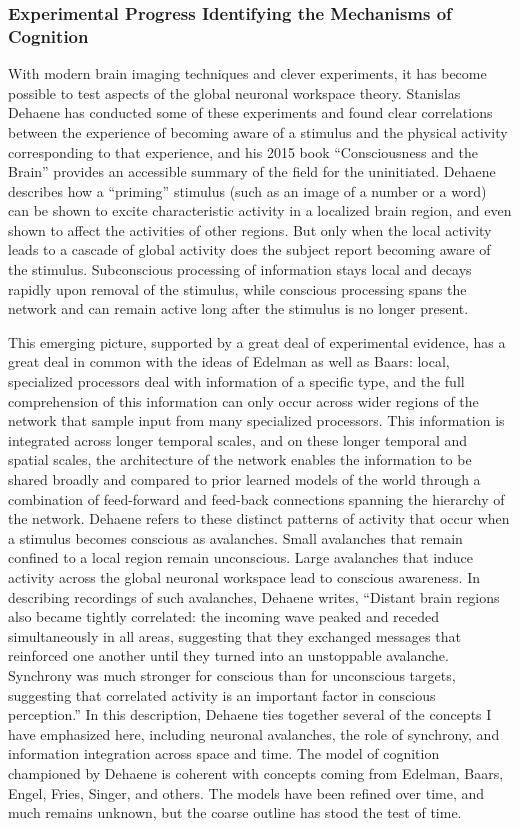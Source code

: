 \subsubsection{Experimental Progress Identifying the Mechanisms of Cognition}
With modern brain imaging techniques and clever experiments, it has become possible to test aspects of the global neuronal workspace theory. Stanislas Dehaene has conducted some of these experiments and found clear correlations between the experience of becoming aware of a stimulus and the physical activity corresponding to that experience, and his 2015 book ``Consciousness and the Brain'' provides an accessible summary of the field for the uninitiated. Dehaene describes how a ``priming'' stimulus (such as an image of a number or a word) can be shown to excite characteristic activity in a localized brain region, and even shown to affect the activities of other regions. But only when the local activity leads to a cascade of global activity does the subject report becoming aware of the stimulus. Subconscious processing of information stays local and decays rapidly upon removal of the stimulus, while conscious processing spans the network and can remain active long after the stimulus is no longer present.

This emerging picture, supported by a great deal of experimental evidence, has a great deal in common with the ideas of Edelman as well as Baars: local, specialized processors deal with information of a specific type, and the full comprehension of this information can only occur across wider regions of the network that sample input from many specialized processors. This information is integrated across longer temporal scales, and on these longer temporal and spatial scales, the architecture of the network enables the information to be shared broadly and compared to prior learned models of the world through a combination of feed-forward and feed-back connections spanning the hierarchy of the network. Dehaene refers to these distinct patterns of activity that occur when a stimulus becomes conscious as avalanches. Small avalanches that remain confined to a local region remain unconscious. Large avalanches that induce activity across the global neuronal workspace lead to conscious awareness. In describing recordings of such avalanches, Dehaene writes, ``Distant brain regions also became tightly correlated: the incoming wave peaked and receded simultaneously in all areas, suggesting that they exchanged messages that reinforced one another until they turned into an unstoppable avalanche. Synchrony was much stronger for conscious than for unconscious targets, suggesting that correlated activity is an important factor in conscious perception.'' \cite{de2015} In this description, Dehaene ties together several of the concepts I have emphasized here, including neuronal avalanches, the role of synchrony, and information integration across space and time. The model of cognition championed by Dehaene is coherent with concepts coming from Edelman, Baars, Engel, Fries, Singer, and others. The models have been refined over time, and much remains unknown, but the coarse outline has stood the test of time. 


